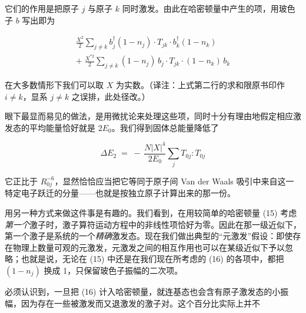 它们的作用是把原子 $j$ 与原子 $k$ 同时激发。由此在哈密顿量中产生的项，用玻色子 $b$ 写出即为

\begin{gather*}
\frac{X^{2}}{2} \sum_{j\neq k} b_j^{\dagger}(1-n_j)\cdot T_{jk}\cdot b_k^{\dagger}(1-n_k) \\
+\; \frac{X^{*2}}{2} \sum_{j\neq k} (1-n_j)\, b_j\cdot T_{jk}\cdot(1-n_k)\, b_k \tag{16}
\end{gather*}

在大多数情形下我们可以取 $X$ 为实数。（译注：上式第二行的求和限原书印作 $i\neq k$，显系 $j\neq k$ 之误排，此处径改。）

眼下最显而易见的做法，是用微扰论来处理这些项，同时十分有理由地假定相应激发态的平均能量恰好就是 $2E_0$。我们得到固体总能量降低了

\begin{equation*}
\Delta E_2 \;=\; -\, \frac{N|X|^{4}}{2E_0} \sum_j T_{0j}:T_{0j}
\end{equation*}

它正比于 $R_{0j}^{-6}$，显然恰恰应当把它等同于原子间 Van der Waals 吸引中来自这一特定电子跃迁的分量——也就是按独立原子计算出来的那一份。

用另一种方式来做这件事是有趣的。我们看到，在用较简单的哈密顿量 (15) 考虑\emph{第一个}激子时，激子算符运动方程中的非线性项恰好为零。因此在那一级近似下，第一个激子是系统的一个\emph{精确}激发态。现在我们做出典型的“元激发”假设：即使存在物理上数量可观的元激发，元激发之间的相互作用也可以在某级近似下予以忽略；也就是说，无论在 (15) 中还是在我们现在所考虑的 (16) 的各项中，都把 $(1-n_j)$ 换成 1，只保留玻色子振幅的二次项。

必须认识到，一旦把 (16) 计入哈密顿量，就连基态也会含有原子激发态的小振幅，因为存在一些被激发而又退激发的激子对。这个百分比实际上并不

